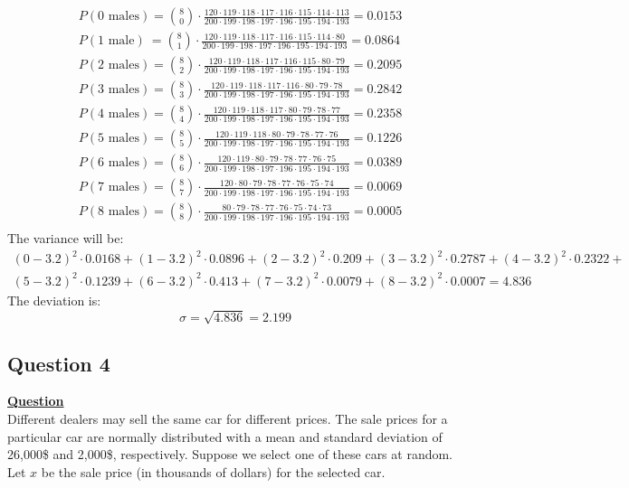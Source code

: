 \documentclass[a4, 12pt,titlepage]{scrartcl}
\begin{document}
\begin{align*}
&P(\textrm{0 males}) =\binom{8}{0}\cdot \frac{120\cdot119\cdot118\cdot117\cdot116\cdot115\cdot114\cdot113}{200\cdot199\cdot198\cdot197\cdot196\cdot195\cdot194\cdot193} =0.0153
\\
&P(\textrm{1 male})\ =\binom{8}{1}\cdot \frac{120\cdot119\cdot118\cdot117\cdot116\cdot115\cdot114\cdot80}{200\cdot199\cdot198\cdot197\cdot196\cdot195\cdot194\cdot193}=0.0864
\\
&P(\textrm{2 males})=\binom{8}{2}\cdot \frac{120\cdot119\cdot118\cdot117\cdot116\cdot115\cdot80\cdot79}{200\cdot199\cdot198\cdot197\cdot196\cdot195\cdot194\cdot193}=0.2095
\\
&P(\textrm{3 males})=\binom{8}{3}\cdot \frac{120\cdot119\cdot118\cdot117\cdot116\cdot80\cdot79\cdot78}{200\cdot199\cdot198\cdot197\cdot196\cdot195\cdot194\cdot193}=0.2842
\\
&P(\textrm{4 males})=\binom{8}{4}\cdot \frac{120\cdot119\cdot118\cdot117\cdot80\cdot79\cdot78\cdot77}{200\cdot199\cdot198\cdot197\cdot196\cdot195\cdot194\cdot193}=0.2358
\\
&P(\textrm{5 males})=\binom{8}{5}\cdot \frac{120\cdot119\cdot118\cdot80\cdot79\cdot78\cdot77\cdot76}{200\cdot199\cdot198\cdot197\cdot196\cdot195\cdot194\cdot193}=0.1226
\\
&P(\textrm{6 males})=\binom{8}{6}\cdot \frac{120\cdot119\cdot80\cdot79\cdot78\cdot77\cdot76\cdot75}{200\cdot199\cdot198\cdot197\cdot196\cdot195\cdot194\cdot193}=0.0389
\\
&P(\textrm{7 males})=\binom{8}{7}\cdot \frac{120\cdot80\cdot79\cdot78\cdot77\cdot76\cdot75\cdot74}{200\cdot199\cdot198\cdot197\cdot196\cdot195\cdot194\cdot193}=0.0069
\\
&P(\textrm{8 males})=\binom{8}{8}\cdot \frac{80\cdot79\cdot78\cdot77\cdot76\cdot75\cdot74\cdot73}{200\cdot199\cdot198\cdot197\cdot196\cdot195\cdot194\cdot193}=0.0005
\\
\end{align*}
The variance will be:
\begin{multline*}
(0-3.2)^2\cdot 0.0168+(1-3.2)^2\cdot 0.0896 + (2-3.2)^2\cdot 0.209 + (3-3.2)^2\cdot 0.2787 + (4-3.2)^2 \cdot 0.2322 +\\
 (5-3.2)^2 \cdot 0.1239 + (6-3.2)^2 \cdot 0.413 + (7-3.2)^2 \cdot 0.0079 + (8-3.2)^2 \cdot 0.0007=4.836
\end{multline*}
The deviation is:\[
\boxed{\sigma= \sqrt{4.836}=2.199}
\]
\newpage

\subsection{Question 4}
\textbf{\underline{Question}}\\
Different dealers may sell the same car for different prices.
The sale prices for a particular car are normally distributed with a mean and standard deviation of 26,000\$ and 2,000\$, respectively.
 Suppose we select one of these cars at random.
 Let $x$ be the sale price (in thousands of dollars) for the selected car.\\
 
\end{document}
